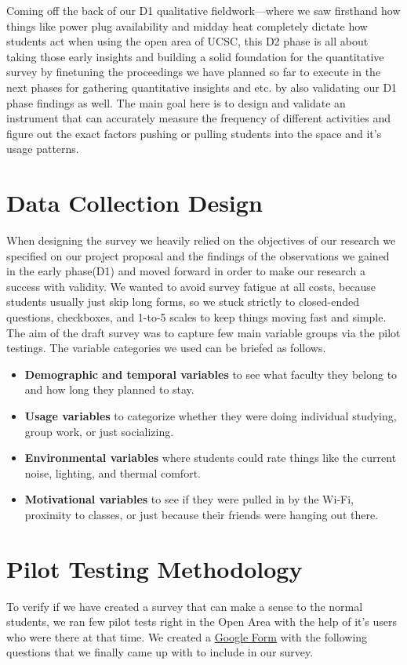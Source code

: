 \documentclass[12pt, a4paper]{report}
\begin{document}
Coming off the back of our D1 qualitative fieldwork—where we saw firsthand how things like power plug availability and midday heat completely dictate how students act when using the open area of UCSC, this D2 phase is all about taking those early insights and building a solid foundation for the quantitative survey by finetuning the proceedings we have planned so far to execute in the next phases for gathering quantitative insights and etc. by also validating our D1 phase findings as well. The main goal here is to design and validate an instrument that can accurately measure the frequency of different activities and figure out the exact factors pushing or pulling students into the space and it's usage patterns.

\chapter{Data Collection Design}
When designing the survey we heavily relied on the objectives of our research we specified on our project proposal and the findings of the observations we gained in the early phase(D1) and moved forward in order to make our research a success with validity. We wanted to avoid survey fatigue at all costs, because students usually just skip long forms, so we stuck strictly to closed-ended questions, checkboxes, and 1-to-5 scales to keep things moving fast and simple. The aim of the draft survey was to capture few main variable groups via the pilot testings. The variable categories we used can be briefed as follows.
\begin{itemize}
\item \textbf{Demographic and temporal variables} to see what faculty they belong to and how long they planned to stay.
\item \textbf{Usage variables} to categorize whether they were doing individual studying, group work, or just socializing.
\item \textbf{Environmental variables} where students could rate things like the current noise, lighting, and thermal comfort.
\item \textbf{Motivational variables} to see if they were pulled in by the Wi-Fi, proximity to classes, or just because their friends were hanging out there.
\end{itemize}

\chapter{Pilot Testing Methodology}
To verify if we have created a survey that can make a sense to the normal students, we ran few pilot tests right in the Open Area with the help of it's users who were there at that time. We created a \href{https://docs.google.com/forms/d/e/1FAIpQLSeu4iXarbDWG3o-umhNbCiAfVOEawvgWIx13IcGa5CEnnVh-w/viewform?usp=dialog}{Google Form} with the following questions that we finally came up with to include in our survey.
\end{document}

